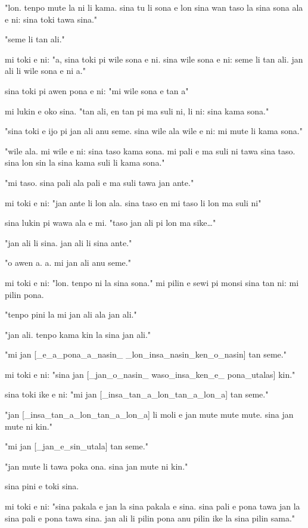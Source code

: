 \documentclass{article}
\begin{document}
"lon. tenpo mute la ni li kama. sina tu li sona e lon sina wan taso la sina sona ala e ni: sina toki tawa sina."

"seme li tan ali."

mi toki e ni: "a, sina toki pi wile sona e ni. sina wile sona e ni: seme li tan ali. jan ali li wile sona e ni a."

sina toki pi awen pona e ni: "mi wile sona e tan a"

mi lukin e oko sina. "tan ali, en tan pi ma suli ni, li ni: sina kama sona."

"sina toki e ijo pi jan ali anu seme. sina wile ala wile e ni: mi mute li kama sona."

"wile ala. mi wile e ni: sina taso kama sona. mi pali e ma suli ni tawa sina taso. sina lon sin la sina kama suli li kama sona."

"mi taso. sina pali ala pali e ma suli tawa jan ante."

mi toki e ni: "jan ante li lon ala. sina taso en mi taso li lon ma suli ni"

sina lukin pi wawa ala e mi. "taso jan ali pi lon ma sike…"

"jan ali li sina. jan ali li sina ante."

"o awen a. a. mi jan ali anu seme."

mi toki e ni: "lon. tenpo ni la sina sona." mi pilin e sewi pi monsi sina tan ni: mi pilin pona.

"tenpo pini la mi jan ali ala jan ali."

"jan ali. tenpo kama kin la sina jan ali."

"mi jan {[}\_e\_a\_pona\_a\_nasin\_  \_lon\_insa\_nasin\_ken\_o\_nasin{]} tan seme."

mi toki e ni: "sina jan {[}\_jan\_o\_nasin\_ waso\_insa\_ken\_e\_ pona\_utalas{]} kin."

sina toki ike e ni: "mi jan {[}\_insa\_tan\_a\_lon\_tan\_a\_lon\_a{]} tan seme."

"jan {[}\_insa\_tan\_a\_lon\_tan\_a\_lon\_a{]} li moli e jan mute mute mute. sina jan mute ni kin."

"mi jan {[}\_jan\_e\_sin\_utala{]} tan seme."

"jan mute li tawa poka ona. sina jan mute ni kin."

sina pini e toki sina.

mi toki e ni: "sina pakala e jan la sina pakala e sina. sina pali e pona tawa jan la sina pali e pona tawa sina. jan ali li pilin pona anu pilin ike la sina pilin sama."
\end{document}
